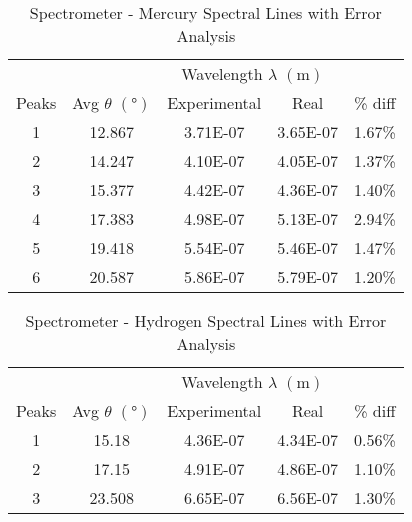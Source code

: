 \documentclass[12pt]{article}
\begin{document}
	\begin{table}[htbp]
		\centering
		\caption{Spectrometer - Mercury Spectral Lines with Error Analysis}
		\begin{tabular}{ccccc}
			\toprule
			&   & \multicolumn{2}{c}{Wavelength $\lambda$ $(\unit{\meter})$} &  \\
			\cmidrule{3-4} Peaks & Avg $\theta$ $(\unit{\degree})$ & Experimental & Real & \% diff \\
			\midrule
			1 & 12.867 & 3.71E-07 & 3.65E-07 & 1.67\% \\
			2 & 14.247 & 4.10E-07 & 4.05E-07 & 1.37\% \\
			3 & 15.377 & 4.42E-07 & 4.36E-07 & 1.40\% \\
			4 & 17.383 & 4.98E-07 & 5.13E-07 & 2.94\% \\
			5 & 19.418 & 5.54E-07 & 5.46E-07 & 1.47\% \\
			6 & 20.587 & 5.86E-07 & 5.79E-07 & 1.20\% \\
			\bottomrule
		\end{tabular}%
		\label{tab:MercurySpectralLineswithErrorAnalysis}%
	\end{table}%
	
	

	\begin{table}[htbp]
		\centering
		\caption{Spectrometer - Hydrogen Spectral Lines with Error Analysis}
		\begin{tabular}{ccccc}
			\toprule
			&   & \multicolumn{2}{c}{Wavelength $\lambda$ $(\unit{\meter})$} &  \\
			\cmidrule{3-4} Peaks & Avg $\theta$ $(\unit{\degree})$ & Experimental & Real & \% diff \\
			\midrule
			1 & 15.18 & 4.36E-07 & 4.34E-07 & 0.56\% \\
			2 & 17.15 & 4.91E-07 & 4.86E-07 & 1.10\% \\
			3 & 23.508 & 6.65E-07 & 6.56E-07 & 1.30\% \\
			\bottomrule
		\end{tabular}%
		\label{tab:HydrogenSpectralLineswithErrorAnalysis}%
	\end{table}%
	
\end{document}
